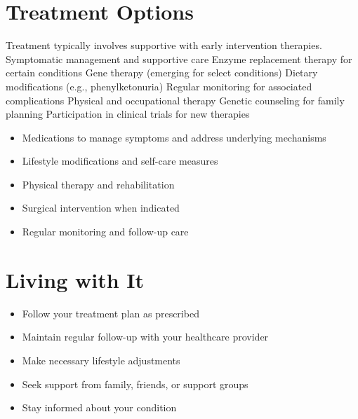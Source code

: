 \section{Treatment Options}
Treatment typically involves supportive with early intervention therapies. Symptomatic management and supportive care Enzyme replacement therapy for certain conditions Gene therapy (emerging for select conditions) Dietary modifications (e.g., phenylketonuria) Regular monitoring for associated complications Physical and occupational therapy Genetic counseling for family planning Participation in clinical trials for new therapies

\begin{itemize}[noitemsep]
  \item Medications to manage symptoms and address underlying mechanisms
  \item Lifestyle modifications and self-care measures
  \item Physical therapy and rehabilitation
  \item Surgical intervention when indicated
  \item Regular monitoring and follow-up care
\end{itemize}
\section{Living with It}
\begin{itemize}[noitemsep]
  \item Follow your treatment plan as prescribed
  \item Maintain regular follow-up with your healthcare provider
  \item Make necessary lifestyle adjustments
  \item Seek support from family, friends, or support groups
  \item Stay informed about your condition
\end{itemize}

